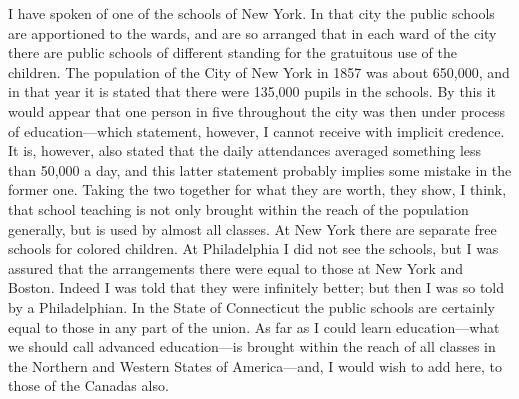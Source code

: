 I have spoken of one of the schools of New York.  In that city the
public schools are apportioned to the wards, and are so arranged
that in each ward of the city there are public schools of different
standing for the gratuitous use of the children.  The population of
the City of New York in 1857 was about 650,000, and in that year it
is stated that there were 135,000 pupils in the schools.  By this
it would appear that one person in five throughout the city was
then under process of education---which statement, however, I cannot
receive with implicit credence.  It is, however, also stated that
the daily attendances averaged something less than 50,000 a day,
and this latter statement probably implies some mistake in the
former one.  Taking the two together for what they are worth, they
show, I think, that school teaching is not only brought within the
reach of the population generally, but is used by almost all
classes.  At New York there are separate free schools for colored
children.  At Philadelphia I did not see the schools, but I was
assured that the arrangements there were equal to those at New York
and Boston.  Indeed I was told that they were infinitely better;
but then I was so told by a Philadelphian.  In the State of
Connecticut the public schools are certainly equal to those in any
part of the union.  As far as I could learn education---what we
should call advanced education---is brought within the reach of all
classes in the Northern and Western States of America---and, I would
wish to add here, to those of the Canadas also.

